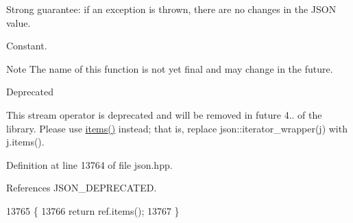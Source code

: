 Strong guarantee\+: if an exception is thrown, there are no changes in the J\+S\+ON value.

Constant.

\begin{DoxyNote}{Note}
The name of this function is not yet final and may change in the future.
\end{DoxyNote}
\begin{DoxyRefDesc}{Deprecated}
\item[\hyperlink{deprecated__deprecated000001}{Deprecated}]This stream operator is deprecated and will be removed in future 4.. of the library. Please use \hyperlink{classnlohmann_1_1basic__json_afe3e137ace692efa08590d8df40f58dd}{items()} instead; that is, replace {\ttfamily json\+::iterator\+\_\+wrapper(j)} with {\ttfamily j.\+items()}. \end{DoxyRefDesc}


Definition at line 13764 of file json.\+hpp.



References J\+S\+O\+N\+\_\+\+D\+E\+P\+R\+E\+C\+A\+T\+ED.


\begin{DoxyCode}
13765     \{
13766         \textcolor{keywordflow}{return} ref.items();
13767     \}
\end{DoxyCode}
\mbox{\label{classnlohmann_1_1basic__json_a4d8795ce15be7ce2a95260663bde640d}} 
